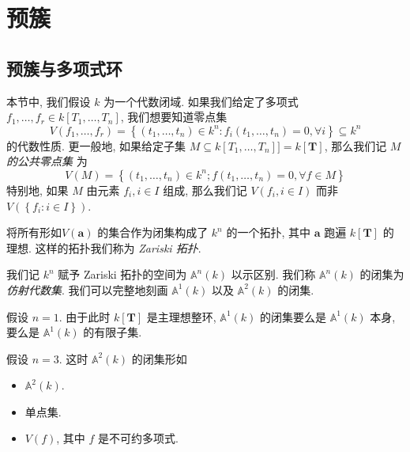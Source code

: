 \section{预簇}

\subsection{预簇与多项式环}

本节中, 我们假设 \( k \) 为一个代数闭域. 如果我们给定了多项式 \( f_1, \ldots,
f_r \in k[T_1, \ldots, T_n] \), 我们想要知道零点集
\[
  V(f_1, \ldots, f_r) = \left\lbrace (t_1, \ldots, t_n) \in k^n: f_i(t_1,
  \ldots, t_n) = 0, \forall i \right\rbrace \subseteq k^n
\]
的代数性质. 更一般地, 如果给定子集 \( M \subseteq k[T_1, \ldots, T_n] ] =
k[\mathbf{T}] \), 那么我们记  \emph{\( M \) 的公共零点集} 为
\[
  V(M) = \left\lbrace (t_1, \ldots, t_n) \in k^n; f(t_1, \ldots, t_n) = 0,
  \forall f \in M \right\rbrace
\]
特别地, 如果 \( M \) 由元素 \( f_i, i \in I \) 组成, 那么我们记 \( V(f_i, i \in
I) \) 而非 \( V(\left\lbrace f_i: i \in I \right\rbrace) \).

\begin{proposition}
  \label{proposition-Zariski-topology-construction}
  将所有形如\( V(\mathbf{a}) \) 的集合作为闭集构成了 \( k^n \) 的一个拓扑, 其中
  \( \mathbf{a} \) 跑遍 \( k[\mathbf{T}] \) 的理想. 这样的拓扑我们称为
  \emph{Zariski 拓扑}.
\end{proposition}

我们记 \( k^n \) 赋予 Zariski 拓扑的空间为 \( \mathbb{A}^n(k) \) 以示区别.
我们称 \( \mathbb{A}^n(k) \) 的闭集为 \emph{仿射代数集}. 我们可以完整地刻画 \(
\mathbb{A}^1(k) \) 以及 \( \mathbb{A}^2(k) \) 的闭集.

\begin{example}
  假设 \( n = 1 \). 由于此时 \( k[\mathbf{T}] \) 是主理想整环, \(
  \mathbb{A}^1(k) \) 的闭集要么是 \( \mathbb{A}^1(k) \) 本身, 要么是 \(
  \mathbb{A}^1(k) \) 的有限子集.
\end{example}

\begin{example}
  假设 \( n = 3 \). 这时 \( \mathbb{A}^2(k) \) 的闭集形如
  \begin{itemize}
    \item \( \mathbb{A}^2(k) \).
    \item 单点集.
    \item \( V(f) \), 其中 \( f \) 是不可约多项式.
  \end{itemize}
\end{example}

